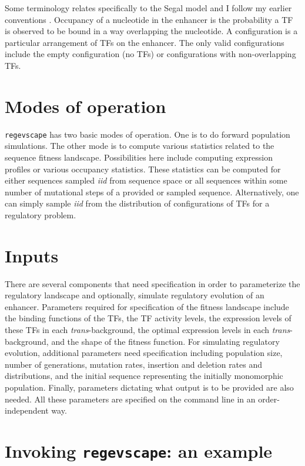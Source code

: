 \documentclass[11pt]{article}
\begin{document}
Some terminology relates specifically to the Segal model and I follow my earlier conventions \cite{Bullaughey:2011p6261}. Occupancy of a nucleotide in the enhancer is the probability a TF is observed to be bound in a way overlapping the nucleotide. A configuration is a particular arrangement of TFs on the enhancer. The only valid configurations include the empty configuration (no TFs) or configurations with non-overlapping TFs. 

\section{Modes of operation}

\texttt{regevscape} has two basic modes of operation. One is to do forward population simulations. The other mode is to compute various statistics related to the sequence fitness landscape. Possibilities here include computing expression profiles or various occupancy statistics. These statistics can be computed for either sequences sampled \emph{iid} from sequence space or all sequences within some number of mutational steps of a provided or sampled sequence. Alternatively, one can simply sample \emph{iid} from the distribution of configurations of TFs for a regulatory problem.

\section{Inputs}

There are several components that need specification in order to parameterize the regulatory landscape and optionally, simulate regulatory evolution of an enhancer. Parameters required for specification of the fitness landscape include the binding functions of the TFs, the TF activity levels, the expression levels of these TFs in each \emph{trans}-background, the optimal expression levels in each \emph{trans}-background, and the shape of the fitness function. For simulating regulatory evolution, additional parameters need specification including population size, number of generations, mutation rates, insertion and deletion rates and distributions, and the initial sequence representing the initially monomorphic population. Finally, parameters dictating what output is to be provided are also needed. All these parameters are specified on the command line in an order-independent way. 

\section{Invoking \texttt{regevscape}: an example}
\end{document}
